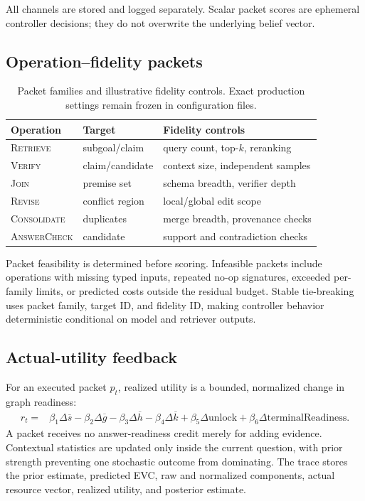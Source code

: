 All channels are stored and logged separately. Scalar packet scores are ephemeral controller decisions; they do not overwrite the underlying belief vector.

\subsection{Operation--fidelity packets}

\begin{table}[h]
\caption{Packet families and illustrative fidelity controls. Exact production settings remain frozen in configuration files.}
\label{tab:packets}
\centering
\begin{tabular}{lll}
\toprule
Operation & Target & Fidelity controls \\
\midrule
\textsc{Retrieve} & subgoal/claim & query count, top-$k$, reranking \\
\textsc{Verify} & claim/candidate & context size, independent samples \\
\textsc{Join} & premise set & schema breadth, verifier depth \\
\textsc{Revise} & conflict region & local/global edit scope \\
\textsc{Consolidate} & duplicates & merge breadth, provenance checks \\
\textsc{AnswerCheck} & candidate & support and contradiction checks \\
\bottomrule
\end{tabular}
\end{table}

Packet feasibility is determined before scoring. Infeasible packets include operations with missing typed inputs, repeated no-op signatures, exceeded per-family limits, or predicted costs outside the residual budget. Stable tie-breaking uses packet family, target ID, and fidelity ID, making controller behavior deterministic conditional on model and retriever outputs.

\subsection{Actual-utility feedback}

For an executed packet $p_t$, realized utility is a bounded, normalized change in graph readiness:
\begin{align}
r_t={}&\beta_1\Delta \overline{s}
-\beta_2\Delta \overline{g}
-\beta_3\Delta \overline{h}
-\beta_4\Delta \overline{k}
+\beta_5\Delta \mathrm{unlock}
+\beta_6\Delta \mathrm{terminalReadiness}.
\end{align}
A packet receives no answer-readiness credit merely for adding evidence. Contextual statistics are updated only inside the current question, with prior strength preventing one stochastic outcome from dominating. The trace stores the prior estimate, predicted EVC, raw and normalized components, actual resource vector, realized utility, and posterior estimate.


